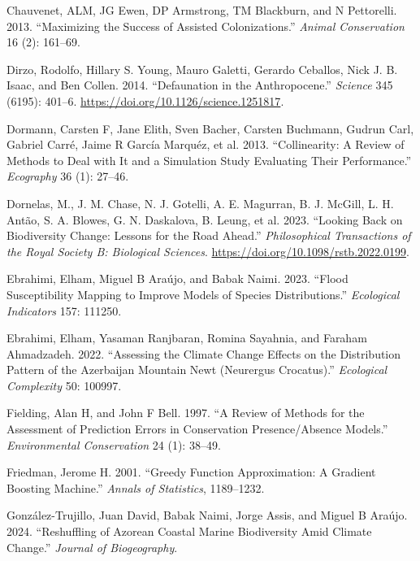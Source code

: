 \documentclass[
]{article}
\newlength{\cslhangindent}
\newenvironment{CSLReferences}[2] %
 {\begin{list}{}{%
  \setlength{\itemindent}{0pt}
  \setlength{\leftmargin}{0pt}
  \setlength{\parsep}{0pt}
  \ifodd #1
   \setlength{\leftmargin}{\cslhangindent}
   \setlength{\itemindent}{-1\cslhangindent}
  \fi
  \setlength{\itemsep}{#2\baselineskip}}}
 {\end{list}}
\begin{document}
\begin{CSLReferences}{1}{0}
Chauvenet, ALM, JG Ewen, DP Armstrong, TM Blackburn, and N Pettorelli.
2013. {``Maximizing the Success of Assisted Colonizations.''}
\emph{Animal Conservation} 16 (2): 161--69.

Dirzo, Rodolfo, Hillary S. Young, Mauro Galetti, Gerardo Ceballos, Nick
J. B. Isaac, and Ben Collen. 2014. {``Defaunation in the
{Anthropocene}.''} \emph{Science} 345 (6195): 401--6.
\url{https://doi.org/10.1126/science.1251817}.

Dormann, Carsten F, Jane Elith, Sven Bacher, Carsten Buchmann, Gudrun
Carl, Gabriel Carré, Jaime R García Marquéz, et al. 2013.
{``Collinearity: A Review of Methods to Deal with It and a Simulation
Study Evaluating Their Performance.''} \emph{Ecography} 36 (1): 27--46.

Dornelas, M., J. M. Chase, N. J. Gotelli, A. E. Magurran, B. J. McGill,
L. H. Antão, S. A. Blowes, G. N. Daskalova, B. Leung, et al. 2023.
{``Looking Back on Biodiversity Change: Lessons for the Road Ahead.''}
\emph{Philosophical Transactions of the Royal Society B: Biological
Sciences}. \url{https://doi.org/10.1098/rstb.2022.0199}.

Ebrahimi, Elham, Miguel B Araújo, and Babak Naimi. 2023. {``Flood
Susceptibility Mapping to Improve Models of Species Distributions.''}
\emph{Ecological Indicators} 157: 111250.

Ebrahimi, Elham, Yasaman Ranjbaran, Romina Sayahnia, and Faraham
Ahmadzadeh. 2022. {``Assessing the Climate Change Effects on the
Distribution Pattern of the Azerbaijan Mountain Newt (Neurergus
Crocatus).''} \emph{Ecological Complexity} 50: 100997.

Fielding, Alan H, and John F Bell. 1997. {``A Review of Methods for the
Assessment of Prediction Errors in Conservation Presence/Absence
Models.''} \emph{Environmental Conservation} 24 (1): 38--49.

Friedman, Jerome H. 2001. {``Greedy Function Approximation: A Gradient
Boosting Machine.''} \emph{Annals of Statistics}, 1189--1232.

González-Trujillo, Juan David, Babak Naimi, Jorge Assis, and Miguel B
Araújo. 2024. {``Reshuffling of Azorean Coastal Marine Biodiversity Amid
Climate Change.''} \emph{Journal of Biogeography}.


\end{CSLReferences}
\end{document}
